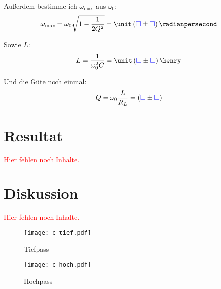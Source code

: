 \documentclass[11pt, ngerman]{article}
\newcommand{\emesswert}{\left(\messwert \pm \messwert \right)}
\newcommand{\fehlt}{\textcolor{red}{Hier fehlen noch Inhalte.}}
\newcommand{\messwert}{\textcolor{blue}{\square}}
\begin{document}
Außerdem bestimme ich $\omega_\text{max}$ aus $\omega_0$:
\[
	\omega_\text{max} = \omega_0 \sqrt{1 - \frac{1}{2 Q^2}} = \unit\emesswert\radianpersecond
\]

Sowie $L$:
\[
	L = \frac{1}{\omega_0^2 C} = \unit\emesswert\henry
\]

Und die Güte noch einmal:
\[
	Q = \omega_0 \frac{L}{R_L} = \emesswert
\]


\section{Resultat}

\fehlt


\section{Diskussion}

\fehlt

%
%

\newpage



%	

\begin{figure}[h!]
	\centering
	\texttt{[image: e\_tief.pdf]}
	\caption{Tiefpass}
	\label{fig:Aufgabe e Tiefpass}
\end{figure}

\begin{figure}[h!]
	\centering
	\texttt{[image: e\_hoch.pdf]}
	\caption{Hochpass}
	\label{fig:Aufgabe e Hochpass}
\end{figure}


\end{document}
